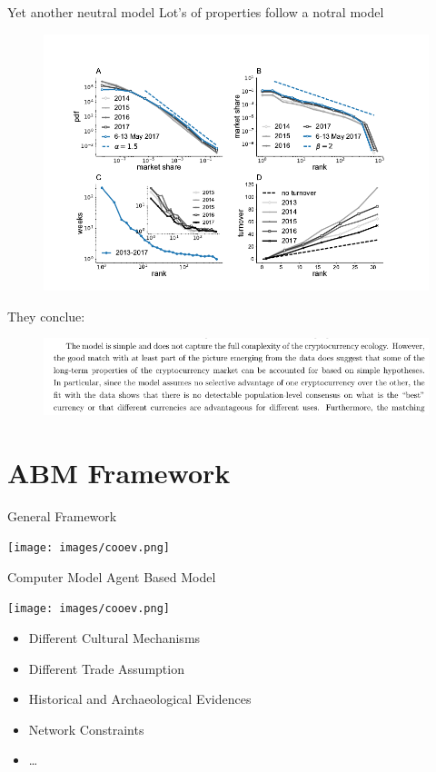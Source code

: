 \documentclass[12pt, notes=show]{beamer}
\begin{document}
\begin{frame}{Yet another neutral model}
    Lot's of properties follow a notral model
    \begin{figure}
	\includegraphics[width=.6\textwidth]{images/btcpic.png}
    \end{figure}

    They conclue:
    \begin{figure}
	\includegraphics[width=\textwidth]{images/btcNoBest.png}
    \end{figure}
\end{frame}

\section{ABM Framework}


\begin{frame}{General Framework}
    
    \begin{center}
	\texttt{[image: images/cooev.png]}	
    \end{center}
\end{frame}

\begin{frame}{Computer Model}
    \vfill
    Agent Based Model
    \begin{center}
	\texttt{[image: images/cooev.png]}	
    \end{center}
    \vfill
	\begin{itemize}
	\item Different Cultural Mechanisms
    \vfill
	\item Different Trade Assumption
    \vfill
	\item Historical and Archaeological Evidences 
    \vfill
	\item Network Constraints
    \vfill
	\item \dots
    \vfill
	\end{itemize}
\end{frame}
	
\end{document}
